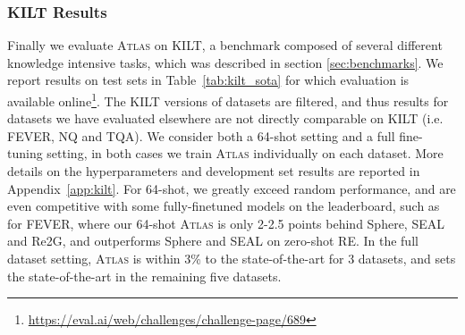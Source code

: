 \documentclass[10pt]{article} \usepackage[preprint]{tmlr}
\newcommand{\Atlas}{\textsc{Atlas}}
\begin{document}
\subsubsection{KILT Results}
Finally we evaluate \Atlas{} on KILT, a benchmark composed of several different knowledge intensive tasks, which was described in section \ref{sec:benchmarks}.
We report results on test sets in Table~\ref{tab:kilt_sota} for which evaluation is available online\footnote{\url{https://eval.ai/web/challenges/challenge-page/689}}.
The KILT versions of datasets are filtered, and thus results for datasets we have evaluated elsewhere are not directly comparable on KILT (i.e. FEVER, NQ and TQA).  
We consider both a 64-shot setting and a full fine-tuning setting, in both cases we train \Atlas{} individually on each dataset.
More details on the hyperparameters and development set results are reported in Appendix~\ref{app:kilt}.
For 64-shot, we greatly exceed random performance, and are even competitive with some fully-finetuned models on the leaderboard, such as for FEVER, where our 64-shot \Atlas{} is only 2-2.5 points behind Sphere, SEAL and Re2G, and outperforms Sphere and SEAL on zero-shot RE.
In the full dataset setting, \Atlas{} is within 3\% to the state-of-the-art for 3 datasets, and sets the state-of-the-art in the remaining five datasets.
\end{document}
